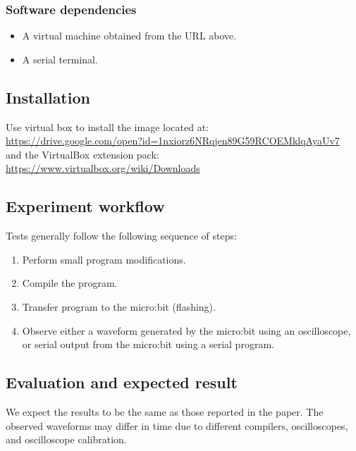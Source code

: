 {\subsubsection{Software dependencies}

\begin{itemize}
    \item A virtual machine obtained from the URL above.
    \item A serial terminal.

\end{itemize}

\subsection{Installation}

Use virtual box to install the image located at:\\[5pt]\url{https://drive.google.com/open?id=1nxiorz6NRqjen89G59RCOEMklqAyaUv7}\\[5pt]
and the VirtualBox extension pack:\\[5pt]\url{https://www.virtualbox.org/wiki/Downloads}
\subsection{Experiment workflow}

Tests generally follow the following sequence of steps:

\begin{enumerate}
    \item Perform small program modifications.
    \item Compile the program.
    \item Transfer program to the micro:bit (flashing).
    \item Observe either a waveform generated by the micro:bit using an oscilloscope, or serial output from the micro:bit using a serial program.
\end{enumerate}

\subsection{Evaluation and expected result}

We expect the results to be the same as those reported in the paper. The observed waveforms may differ in time due to different compilers, oscilloscopes, and oscilloscope calibration.

}
